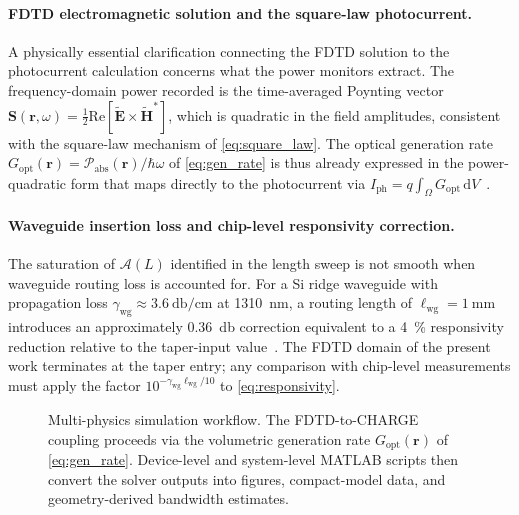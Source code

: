\paragraph{FDTD electromagnetic solution and the square-law photocurrent.}
A physically essential clarification connecting the FDTD solution to the
photocurrent calculation concerns what the power monitors extract. The
frequency-domain power recorded is the time-averaged Poynting vector
$\mathbf{S}(\mathbf{r},\omega)=\tfrac{1}{2}\mathrm{Re}[\tilde{\mathbf{E}}\times\tilde{\mathbf{H}}^*]$,
which is quadratic in the field amplitudes, consistent with the square-law
mechanism of \cref{eq:square_law}. The optical generation rate
$G_{\mathrm{opt}}(\mathbf{r})=\mathcal{P}_{\mathrm{abs}}(\mathbf{r})/\hbar\omega$
of \cref{eq:gen_rate} is thus already expressed in the power-quadratic form that
maps directly to the photocurrent via $I_{\mathrm{ph}}=q\int_\Omega G_{\mathrm{opt}}\,\mathrm{d}V$~\cite{Pilori2019}.

\paragraph{Waveguide insertion loss and chip-level responsivity correction.}
The saturation of $\mathcal{A}(L)$ identified in the length sweep is not
smooth when waveguide routing loss is accounted for. For a Si ridge waveguide
with propagation loss $\gamma_{\mathrm{wg}}\approx\SI{3.6}{\decibel\per\centi\metre}$
at \SI{1310}{\nano\metre}, a routing length of $\ell_{\mathrm{wg}}=\SI{1}{\milli\metre}$
introduces an approximately \SI{0.36}{\decibel} correction equivalent to a
\SI{4}{\percent} responsivity reduction relative to the taper-input
value~\cite{Wang2024}. The FDTD domain of the present work terminates at the
taper entry; any comparison with chip-level measurements must apply the factor
$10^{-\gamma_{\mathrm{wg}}\ell_{\mathrm{wg}}/10}$ to \cref{eq:responsivity}.

\begin{figure}[H]
    \centering
    \caption{Multi-physics simulation workflow. The FDTD-to-CHARGE coupling
    proceeds via the volumetric generation rate $G_{\mathrm{opt}}(\mathbf{r})$
    of \cref{eq:gen_rate}. Device-level and system-level MATLAB scripts then
    convert the solver outputs into figures, compact-model data, and
    geometry-derived bandwidth estimates.}
    \label{fig:sim_flowchart}
\end{figure}

